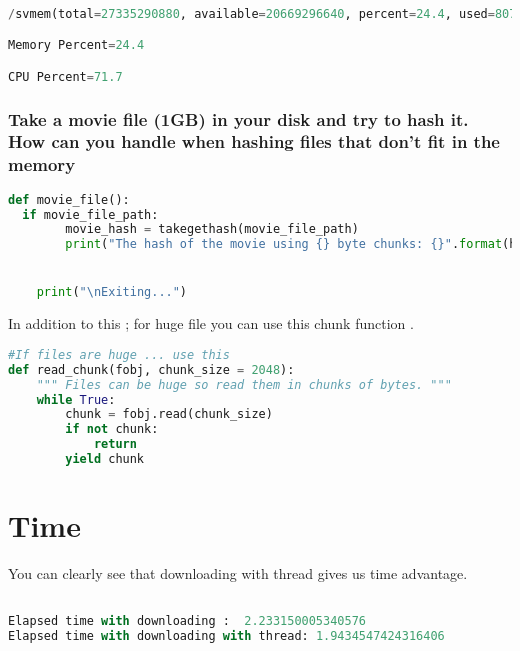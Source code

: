 \documentclass[onecolumn]{article}
\begin{document}
\begin{lstlisting}[language=Python, caption=Output ]

/svmem(total=27335290880, available=20669296640, percent=24.4, used=8078446592, free=12509163520, active=7963410432, inactive=3783192576, buffers=658960384, cached=6088720384, shared=22503424, slab=2435268608)

Memory Percent=24.4

CPU Percent=71.7

\end{lstlisting}

\subsubsection{Take a movie file (1GB) in your disk and try to hash it. How can you handle when hashing files that don't fit in the memory}

\begin{lstlisting}[language=Python, caption= Downloading huge data ]
def movie_file():
  if movie_file_path:
        movie_hash = takegethash(movie_file_path)
        print("The hash of the movie using {} byte chunks: {}".format(hash_buffer_size, movie_hash))


    print("\nExiting...")

    \end{lstlisting}
    
    In addition to this ;  for huge file you can use this chunk  function .
    
    \begin{lstlisting}[language=Python, caption= Chunk is for huge files ]
    #If files are huge ... use this
def read_chunk(fobj, chunk_size = 2048):
    """ Files can be huge so read them in chunks of bytes. """
    while True:
        chunk = fobj.read(chunk_size)
        if not chunk:
            return
        yield chunk
        \end{lstlisting}

\section{Time}

You can clearly see that downloading with thread gives us time advantage. 

\begin{lstlisting}[language=Python, caption=Output Comparing Downloading Process ]

Elapsed time with downloading :  2.233150005340576 
Elapsed time with downloading with thread: 1.9434547424316406 

\end{lstlisting}
\end{document}
